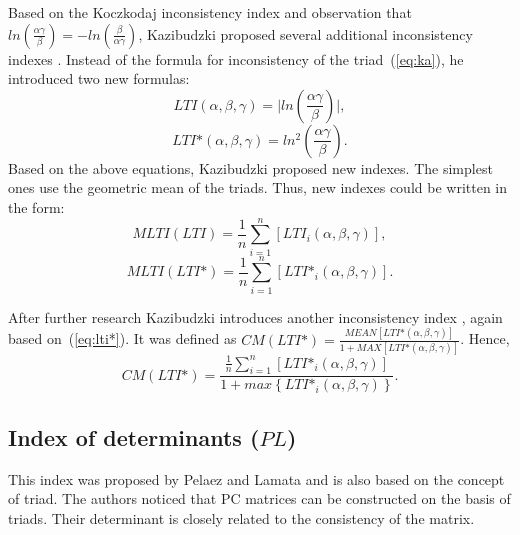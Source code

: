 Based on the Koczkodaj inconsistency index and observation that $ln\left(\frac{\alpha\gamma}{\beta}\right)=-ln\left(\frac{\beta}{\alpha\gamma}\right)$, Kazibudzki proposed several additional inconsistency indexes \cite{Kazibudzki2016}. Instead of the formula for inconsistency of the triad~(\ref{eq:ka}), he introduced two new formulas:
	\begin{equation} 
		\textit{LTI}(\alpha,\beta,\gamma)=\bigl\lvert ln\left(\frac{\alpha\gamma}{\beta}\right)\bigr\rvert,
	 \end{equation}
	\begin{equation}
		\label{eq:lti*} 
		\textit{LTI*}\left(\alpha,\beta,\gamma\right)=ln^{2}\left(\frac{\alpha\gamma}{\beta}\right).
	 \end{equation}
Based on the above equations, Kazibudzki proposed new indexes. The simplest ones use the geometric mean of the triads. Thus, new indexes could be written in the form:
	\begin{equation} 
	\textit{MLTI}(\textit{LTI})=\frac{1}{n}\sum_{i=1}^{n}\left[\textit{LTI}_{i}(\alpha,\beta,\gamma)\right],
	 \end{equation}
 	\begin{equation} 
		\textit{MLTI}(\textit{LTI*})=\frac{1}{n}\sum_{i=1}^{n}\left[\textit{LTI*}_{i}(\alpha,\beta,\gamma)\right].
			 \end{equation}
 

After further research Kazibudzki introduces another inconsistency index \cite{Kazibudzki2017}, again based on~(\ref{eq:lti*}). It was defined as $\textit{CM}(\textit{LTI*})=\frac{\textit{MEAN}[\textit{LTI*}(\alpha,\beta,\gamma)]}{1+\textit{MAX}[\textit{LTI*}(\alpha,\beta,\gamma)]}$. Hence,
	\begin{equation} 
		\textit{CM}(\textit{LTI*})=\frac{\frac{1}{n}\sum_{i=1}^{n}[\textit{LTI*}_{i}(\alpha,\beta,\gamma)]}{1+max\left\{\textit{LTI*}_{i}(\alpha,\beta,\gamma)\right\}}.
	 \end{equation}
 

\subsection{Index of determinants ($\textit{PL}$)}

This index was proposed by Pelaez and Lamata \cite{PELAEZ2003} and is also based on the concept of triad. The authors noticed that PC  matrices can be constructed on the basis of triads. Their determinant is closely related to the consistency of the matrix.

